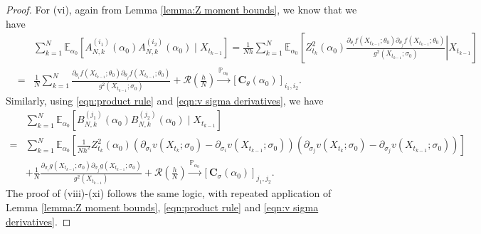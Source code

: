 \documentclass[a4paper,12pt]{article}
\numberwithin{equation}{section}
\theoremstyle{plain}
\theoremstyle{definition}
\begin{document}
\begin{appendix}
\begin{proof}
    For (vi), again from Lemma \ref{lemma:Z moment bounds}, we know that we have 
    \begin{eqnarray*}
        &&\sum_{k=1}^N \mathbb{E}_{\alpha_0}\left[A_{N, k}^{\left(i_1\right)}\left(\alpha_0\right) A_{N, k}^{\left(i_2\right)}\left(\alpha_0\right) \mid X_{t_{k-1}}\right]
        =\frac{1}{Nh}\sum_{k=1}^N\mathbb{E}_{\alpha_0}\left[\left. Z^2_{t_k}(\alpha_0)\frac{\partial_{\theta_i}f(X_{t_{k-1}};\theta_0)\partial_{\theta_j}f(X_{t_{k-1}};\theta_0)}{g^2(X_{t_{k-1}};\sigma_0)}\right|X_{t_{k-1}}\right]\\
        &=&\frac{1}{N}\sum_{k=1}^N\frac{\partial_{\theta_i}f(X_{t_{k-1}};\theta_0)\partial_{\theta_j}f(X_{t_{k-1}};\theta_0)}{g^2(X_{t_{k-1}};\sigma_0)}+\mathcal{R}\left(\frac{h}{N}\right)\xrightarrow{\mathbb{P}_{\alpha_0}}\left[\mathbf{C}_{\theta}(\alpha_0)\right]_{i_1,i_2}.
    \end{eqnarray*}
    Similarly, using \eqref{eqn:product rule} and \eqref{eqn:v sigma derivatives}, we have 
    \begin{align*}
        &\sum_{k=1}^N \mathbb{E}_{\alpha_0}\left[B_{N, k}^{\left(j_1\right)}\left(\alpha_0\right) B_{N, k}^{\left(j_2\right)}\left(\alpha_0\right) \mid X_{t_{k-1}}\right]\\
        =&\sum_{k=1}^N\mathbb{E}_{\alpha_0}\left[\frac{1}{Nh^2}Z^2_{t_k}(\alpha_0)\left(\partial_{\sigma_i}v(X_{t_k};\sigma_0)-\partial_{\sigma_i}v(X_{t_{k-1}};\sigma_0)\right)\left(\partial_{\sigma_j}v(X_{t_k};\sigma_0)-\partial_{\sigma_j}v(X_{t_{k-1}};\sigma_0)\right)\right]\\
        &+\frac{1}{N}\frac{\partial_{\sigma_i}g(X_{t_{k-1}};\sigma_0)\partial_{\sigma_j}g(X_{t_{k-1}};\sigma_0)}{g^2(X_{t_{k-1}})}+\mathcal{R}\left(\frac{h}{N}\right)    \xrightarrow{\mathbb{P}_{\alpha_0}}\left[\mathbf{C}_{\sigma}(\alpha_0)\right]_{j_1,j_2}.
    \end{align*}
    The proof of (viii)-(xi) follows the same logic, with repeated application of Lemma \ref{lemma:Z moment bounds}, \eqref{eqn:product rule} and \eqref{eqn:v sigma derivatives}.
\end{proof}












\end{appendix}
\end{document}
